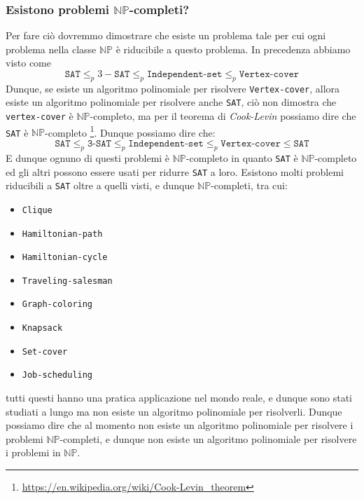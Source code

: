     \subsubsection{Esistono problemi $\mathbb{NP}$-completi?}
        Per fare ciò dovremmo dimostrare che esiste un problema tale per cui ogni problema nella classe $\mathbb{NP}$ è riducibile a questo problema. In precedenza abbiamo visto come
        $$
            \texttt{SAT} \leq_p 3-\texttt{SAT} \leq_p \texttt{Independent-set} \leq_p \texttt{Vertex-cover}
        $$
        Dunque, se esiste un algoritmo polinomiale per risolvere \texttt{Vertex-cover}, allora esiste un algoritmo polinomiale per risolvere anche \texttt{SAT}, ciò non dimostra che \texttt{vertex-cover} è $\mathbb{NP}$-completo, ma per il teorema di \textit{Cook-Levin} possiamo dire che \texttt{SAT} è $\mathbb{NP}$-completo \footnote{\url{https://en.wikipedia.org/wiki/Cook-Levin_theorem}}. Dunque possiamo dire che:
        $$
            \texttt{SAT} \leq_p \texttt{3-SAT} \leq_p \texttt{Independent-set} \leq_p \texttt{Vertex-cover} \leq \texttt{SAT}
        $$
        E dunque ognuno di questi problemi è $\mathbb{NP}$-completo in quanto \texttt{SAT} è $\mathbb{NP}$-completo ed gli altri possono essere usati per ridurre \texttt{SAT} a loro.\newline
        Esistono molti problemi riducibili a \texttt{SAT} oltre a quelli visti, e dunque $\mathbb{NP}$-completi, tra cui:
        \begin{itemize}
            \item \texttt{Clique}
            \item \texttt{Hamiltonian-path}
            \item \texttt{Hamiltonian-cycle}
            \item \texttt{Traveling-salesman}
            \item \texttt{Graph-coloring}
            \item \texttt{Knapsack}
            \item \texttt{Set-cover}
            \item \texttt{Job-scheduling}
        \end{itemize}
        tutti questi hanno una pratica applicazione nel mondo reale, e dunque sono stati studiati a lungo ma non esiste un algoritmo polinomiale per risolverli. Dunque possiamo dire che al momento non esiste un algoritmo polinomiale per risolvere i problemi $\mathbb{NP}$-completi, e dunque non esiste un algoritmo polinomiale per risolvere i problemi in $\mathbb{NP}$.